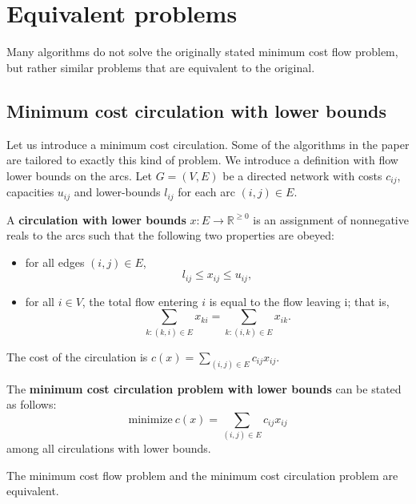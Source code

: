 \section{Equivalent problems}
Many algorithms do not solve the originally stated minimum cost flow problem, but rather similar problems that are equivalent to the original. 

\subsection{Minimum cost circulation with lower bounds}
Let us introduce a minimum cost circulation. Some of the algorithms in the paper are tailored to exactly this kind of problem.
We introduce a definition with flow lower bounds on the arcs. Let $G=(V,E)$ be a directed network with costs $c_{ij}$, capacities $u_{ij}$ and lower-bounds $l_{ij}$ for each arc $(i,j) \in E$.

\begin{defn}
    A \textbf{circulation with lower bounds} $x: E \rightarrow \mathbb{R}^{\geq 0}$ is an assignment of nonnegative reals to the arcs such that the following two properties are obeyed:
    \begin{itemize}
        \item for all edges $(i,j) \in E$, \[
        l_{ij}\leq x_{ij} \leq u_{ij},
        \]
        \item for all $i\in V$, the total flow entering $i$ is equal to the flow leaving i; that is, \[
        \sum_{k\colon (k,i)\in E}x_{ki} =  \sum_{k\colon (i,k)\in E}x_{ik}\text{.}
        \]
    \end{itemize}
    The cost of the circulation is $c(x) = \sum_{(i,j)\in E} c_{ij}x_{ij}$.
\end{defn}
\begin{defn}
    The \textbf{minimum cost circulation problem with lower bounds}  can be stated as follows: \[\text{minimize}\ c(x) = \sum_{(i,j)\in E} c_{ij}x_{ij}\]
    among all circulations with lower bounds.
\end{defn}

\begin{theorem}
    The minimum cost flow problem and the minimum cost circulation problem are equivalent.
\end{theorem}

